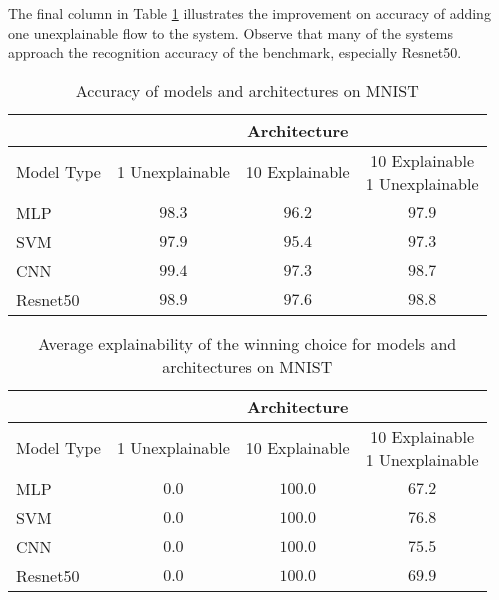 The final column in Table \ref{tab:mnist_accuracy_results} illustrates the
improvement on accuracy of adding one unexplainable flow to the system.  Observe
that many of the systems approach the recognition accuracy of the benchmark,
especially Resnet50.

\begin{table}
    \renewcommand{\arraystretch}{1.3}
    \centering
    \caption{Accuracy of models and architectures on MNIST}
    \begin{tabular}{|l|c|c|c|}
        \cline{2-4}
        \multicolumn{1}{c|}{} & \multicolumn{3}{c|}{Architecture} \\
        \hline
        Model Type & 1 Unexplainable & 10 Explainable & \parbox[t]{3.3cm}{10 Explainable\\1 Unexplainable}\\
        \hline
        \hline
        MLP & $98.3$ & $96.2$ & $97.9$ \\
        \hline
        SVM & $97.9$ & $95.4$ & $97.3$ \\
        \hline
        CNN & $99.4$ & $97.3$ & $98.7$ \\
        \hline
        Resnet50 & $98.9$ & $97.6$ & $98.8$ \\
        \hline
    \end{tabular}
    \label{tab:mnist_accuracy_results}
\end{table}

\begin{table}
    \renewcommand{\arraystretch}{1.3}
    \centering
    \caption{Average explainability of the winning choice for models and architectures on MNIST}
    \begin{tabular}{|l|c|c|c|}
        \cline{2-4}
        \multicolumn{1}{c|}{} & \multicolumn{3}{c|}{Architecture} \\
        \hline
        Model Type & 1 Unexplainable & 10 Explainable & \parbox[t]{3.3cm}{10 Explainable\\1 Unexplainable}\\
        \hline
        \hline
        MLP & $0.0$ & $100.0$ & $67.2$ \\
        \hline
        SVM & $0.0$ & $100.0$ & $76.8$ \\
        \hline
        CNN & $0.0$ & $100.0$ & $75.5$ \\
        \hline
        Resnet50 & $0.0$ & $100.0$ & $69.9$ \\
        \hline
    \end{tabular}
    \label{tab:mnist_explainability_results}
\end{table}


